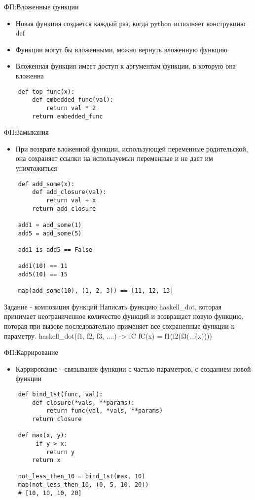 \documentclass{article}
\begin{document}
{\center ФП:Вложенные функции}
\begin{itemize}
    \item Новая функция создается каждый раз, когда python исполняет конструкцию def
    \item Функции могут бы вложенными, можно вернуть вложенную функцию
    \item Вложенная функция имеет доступ к аргументам функции, в которую она вложенна
\end{itemize}
\vspace{15pt}
\begin{lstlisting}
    def top_func(x):
        def embedded_func(val):
            return val * 2
        return embedded_func
\end{lstlisting}
\newpage

{\center ФП:Замыкания}
\begin{itemize}
    \item При возврате вложенной функции, использующей переменные родительской,
        она сохраняет ссылки на используемын переменные и не дает им уничтожиться
\end{itemize}
\vspace{15pt}
\begin{lstlisting}
    def add_some(x):
        def add_closure(val):
            return val + x
        return add_closure

    add1 = add_some(1)
    add5 = add_some(5)

    add1 is add5 == False

    add1(10) == 11
    add5(10) == 15

    map(add_some(10), (1, 2, 3)) == [11, 12, 13]
\end{lstlisting}
\newpage

{\center Задание - композиция функций}
Написать функцию haskell\_dot, которая принимает неограниченное количество функций
и возвращает новую функцию, поторая при вызове последовательно применяет все 
сохраненные функции к параметру.
haskell\_dot(f1, f2, f3, ....) -> fC
fC(x) = f1(f2(f3(...(x))))
\newpage

{\center ФП:Каррирование}
\begin{itemize}
    \item Каррирование - связывание функции с частью параметров, с созданием новой функции
\end{itemize}
\vspace{15pt}
\begin{lstlisting}
    def bind_1st(func, val):
        def closure(*vals, **params):
            return func(val, *vals, **params)
        return closure

    def max(x, y):
         if y > x:
            return y
        return x

    not_less_then_10 = bind_1st(max, 10)
    map(not_less_then_10, (0, 5, 10, 20))
    # [10, 10, 10, 20]
\end{lstlisting}
\newpage
\end{document}
